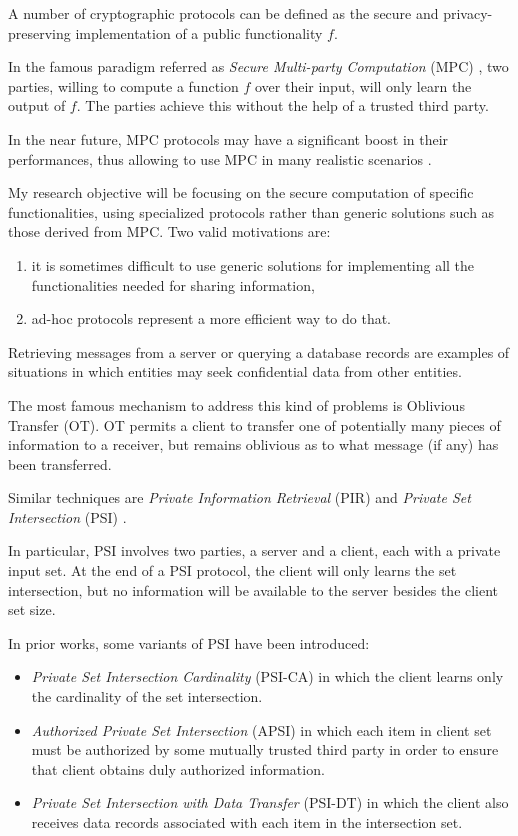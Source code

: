 \documentclass[dvips,12pt]{article}
\begin{document}
A number of cryptographic protocols can be defined as the secure and privacy-preserving implementation of a public functionality $f$.

In the famous paradigm referred as \emph{Secure Multi-party Computation} (MPC) \cite{Yao}, two parties, willing to compute a function $f$ over their input, will only learn the output of $f$.
The parties achieve this without the help of a trusted third party.

In the near future, MPC protocols may have a significant boost in their performances, thus allowing to use MPC in many realistic scenarios \cite{orlandi2011multiparty}.

My research objective will be focusing on the secure computation of specific functionalities, using specialized protocols rather than generic solutions such as those derived from MPC.
Two valid motivations are:
\begin{enumerate}
\item it is sometimes difficult to use generic solutions for implementing all the functionalities needed for sharing information,
\item ad-hoc protocols represent a more efficient way to do that.
\end{enumerate} 

Retrieving messages from a server or querying a database records are examples of situations in which entities may seek confidential data from other entities. 

The most famous mechanism to address this kind of problems is Oblivious Transfer (OT)\cite{oblivious}.
OT permits a client to transfer one of potentially many pieces of information to a receiver, but remains oblivious as to what message (if any) has been transferred.

Similar techniques are \emph{Private Information Retrieval} (PIR) \cite{pir} and \emph{Private Set Intersection} (PSI) \cite{psi}. 

In particular, PSI involves two parties, a server and a client, each with a private input set.
At the end of a PSI protocol, the client will only learns the set intersection, but no information will be available to the server besides the client set size.

In prior works, some variants of PSI have been introduced:
\begin{itemize}
\item \emph{Private Set Intersection Cardinality} (PSI-CA) in which the client learns only the cardinality of the set intersection.
\item \emph{Authorized Private Set Intersection} (APSI) in which each item in client set must be authorized by some mutually trusted third party in order to ensure that client obtains duly authorized information.
\item \emph{Private Set Intersection with Data Transfer} (PSI-DT) in which the client also receives data records associated with each item in the intersection set.
\end{itemize}
\end{document}
